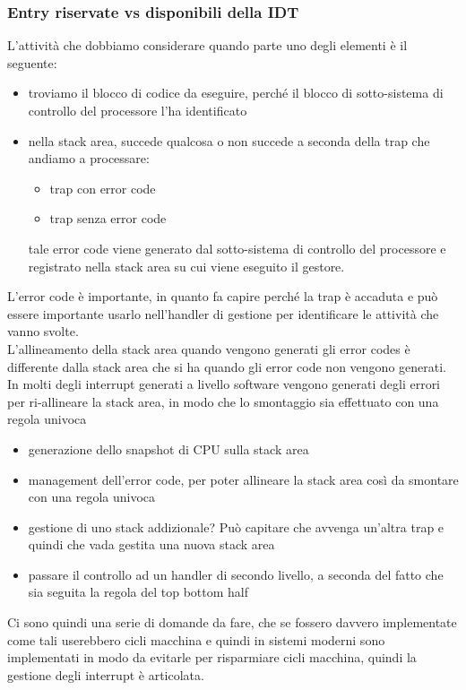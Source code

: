 \documentclass[12pt, oneside]{extbook}
\begin{document}
\subsubsection{Entry riservate vs disponibili della IDT}
L'attività che dobbiamo considerare quando parte uno degli elementi è il seguente:
\begin{itemize}
\item troviamo il blocco di codice da eseguire, perché il blocco di sotto-sistema di controllo del processore l'ha identificato
\item nella stack area, succede qualcosa o non succede a seconda della trap che andiamo a processare:
\begin{itemize}
\item trap con error code
\item trap senza error code
\end{itemize}
tale error code viene generato dal sotto-sistema di controllo del processore e registrato nella stack area su cui viene eseguito il gestore.
\end{itemize}
L'error code è importante, in quanto fa capire perché la trap è accaduta e può essere importante usarlo nell'handler di gestione per identificare le attività che vanno svolte.\\L'allineamento della stack area quando vengono generati gli error codes è differente dalla stack area che si ha quando gli error code non vengono generati. In molti degli interrupt generati a livello software vengono generati degli errori per ri-allineare la stack area, in modo che lo smontaggio sia effettuato con una regola univoca
\begin{itemize}
\item generazione dello snapshot di CPU sulla stack area
\item management dell'error code, per poter allineare la stack area così da smontare con una regola univoca
\item gestione di uno stack addizionale? Può capitare che avvenga un'altra trap e quindi che vada gestita una nuova stack area
\item passare il controllo ad un handler di secondo livello, a seconda del fatto che sia seguita la regola del top bottom half
\end{itemize}
Ci sono quindi una serie di domande da fare, che se fossero davvero implementate come tali userebbero cicli macchina e quindi in sistemi moderni sono implementati in modo da evitarle per risparmiare cicli macchina, quindi la gestione degli interrupt è articolata.
\end{document}
